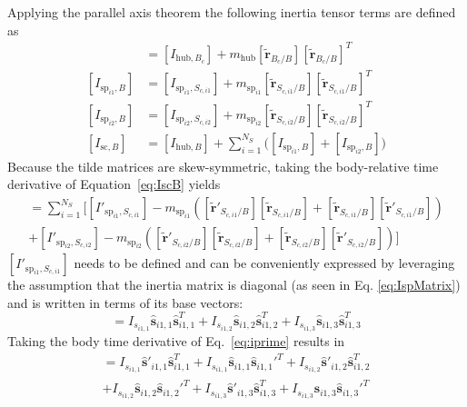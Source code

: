 \documentclass[paper]{aiaaNew}
\begin{document}
	Applying the parallel axis theorem the following inertia tensor terms are defined as
\begin{align}
[I_{\text{hub},B}] &= [I_{\text{hub},B_c}] + m_{\text{hub}}[\bm{\tilde{r}}_{B_c/B}] [\bm{\tilde{r}}_{B_c/B}]^T
\label{eq:IHubB}
\\
[I_{\text{sp}_{i1},B}] &= [I_{\text{sp}_{i1},S_{c,i1}}] + m_{\text{sp}_{i1}}[\bm{\tilde{r}}_{S_{c,i1}/B}] [\bm{\tilde{r}}_{S_{c,{i1}}/B}]^T
\\
[I_{\text{sp}_{i2},B}] &= [I_{\text{sp}_{i2},S_{c,i2}}] + m_{\text{sp}_{i2}}[\bm{\tilde{r}}_{S_{c,i2}/B}] [\bm{\tilde{r}}_{S_{c,{i2}}/B}]^T
\\
[I_{\text{sc},B}] &= [I_{\text{hub},B}] + \sum\limits_{i=1}^{N_S}\Big( [I_{\text{sp}_{i1},B}] + [I_{\text{sp}_{i2},B}]\Big)
\label{eq:IscB}
\end{align}
Because the tilde matrices are skew-symmetric, taking the body-relative time derivative of Equation~\eqref{eq:IscB} yields
\begin{multline}
[I'_{\text{sc},B}] = \sum\limits_{i=1}^{N_S} \Big[[I'_{\text{sp}_{i1},S_{c,i1}}] - m_{\text{sp}_{i1}}\left([\bm{\tilde{r}}'_{S_{c,{i1}}/B}] [\bm{\tilde{r}}_{S_{c,{i1}}/B}] + [\bm{\tilde{r}}_{S_{c,{i1}}/B}] [\bm{\tilde{r}}'_{S_{c,{i1}}/B}]\right)\\
+[I'_{\text{sp}_{i2},S_{c,i2}}] - m_{\text{sp}_{i2}}\left([\bm{\tilde{r}}'_{S_{c,{i2}}/B}] [\bm{\tilde{r}}_{S_{c,{i2}}/B}] + [\bm{\tilde{r}}_{S_{c,{i2}}/B}] [\bm{\tilde{r}}'_{S_{c,{i2}}/B}]\right)\Big]
\label{eq:IprimeScB}
\end{multline}
$[I'_{\text{sp}_{i1},S_{c,i1}}]$ needs to be defined and can be conveniently expressed by leveraging the assumption that the inertia matrix is diagonal (as seen in Eq. \eqref{eq:IspMatrix}) and is written in terms of its base vectors:
\begin{equation}
[I_{\text{sp}_{i1},S_{c,i1}}] = I_{s_{i1,1}}\hat{\bm s}_{i1,1}\hat{\bm s}_{i1,1}^{T}+I_{s_{i1,2}}\hat{\bm s}_{i1,2}\hat{\bm s}_{i1,2}^{T}+I_{s_{i1,3}}\hat{\bm s}_{i1,3}\hat{\bm s}_{i1,3}^{T}
\label{eq:iprime}
\end{equation}
Taking the body time derivative of Eq.~\eqref{eq:iprime} results in
\begin{multline}
[I'_{\text{sp}_{i1},S_{c,i1}}] = I_{s_{i1,1}}\hat{\bm s}'_{i1,1}\hat{\bm s}_{i1,1}^{T}+I_{s_{i1,1}}\hat{\bm s}_{i1,1}\hat{\bm s}_{i1,1}'^{T}+I_{s_{i1,2}}\hat{\bm s}'_{i1,2}\hat{\bm s}_{i1,2}^{T}\\
+I_{s_{i1,2}}\hat{\bm s}_{i1,2}\hat{\bm s}_{i1,2}'^{T}+I_{s_{i1,3}}\hat{\bm s}'_{i1,3}\hat{\bm s}_{i1,3}^{T}+I_{s_{i1,3}}\hat{\bm s}_{i1,3}\hat{\bm s}_{i1,3}'^{T}
\label{eq:iprime2}
\end{multline}
\end{document}
